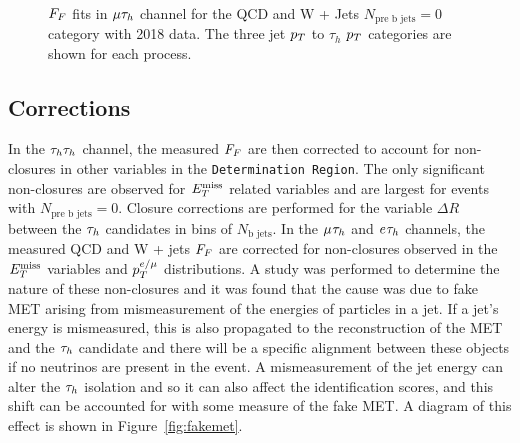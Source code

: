 \begin{figure}[!hbtp]
     \\
\caption[Plots of the fake factor fits in the $\mu\tauh$ channel.]{$F_{F}$ fits in $\mu\tauh$ channel for the QCD and W + Jets $N_{\text{pre b jets}}=0$ category with 2018 data. The three jet $p_{T}$ to $\tau_h$ $p_{T}$ categories are shown for each process.}
\label{fig:mt_ff_fit}
\end{figure}

\subsection{Corrections}

In the $\tau_{h}\tau_{h}$ channel, the measured $F_{F}$ are then corrected to account for non-closures in other variables in the \texttt{Determination Region}. 
The only significant non-closures are observed for $E_{T}^{\text{miss}}$ related variables and are largest for events with $N_{\text{pre b jets}}=0$. 
Closure corrections are performed for the variable $\Delta R$ between the $\tau_{h}$ candidates in bins of $N_{\text{b jets}}$.
In the $\mu_{}\tau_{h}$ and $e_{}\tau_{h}$ channels, the measured QCD and W + jets $F_{F}$ are corrected for non-closures observed in the $E_{T}^{\text{miss}}$ variables and $p_{T}^{e/\mu}$ distributions.
A study was performed to determine the nature of these non-closures and it was found that the cause was due to fake \ac{MET} arising from mismeasurement of the energies of particles in a jet. 
If a jet's energy is mismeasured, this is also propagated to the reconstruction of the \ac{MET} and the $\tau_{h}$ candidate and there will be a specific alignment between these objects if no neutrinos are present in the event.
A mismeasurement of the jet energy can alter the $\tau_{h}$ isolation and so it can also affect the identification scores, and this shift can be accounted for with some measure of the fake \ac{MET}.
A diagram of this effect is shown in Figure~\ref{fig:fakemet}. \\

